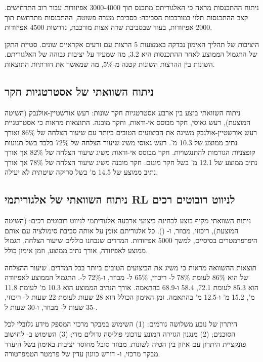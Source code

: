 ניתוח ההתכנסות מראה כי האלגוריתם מתכנס תוך 3000-4000 אפיזודות עבור רוב התרחישים. קצב ההתכנסות תלוי במורכבות הסביבה: בסביבת מערה פשוטה, ההתכנסות מתרחשת תוך 2000 אפיזודות, בעוד שבסביבת שדה אצות מורכבת, נדרשות 4500 אפיזודות.

היציבות של תהליך האימון נבדקה באמצעות 5 הרצות עם זרעים אקראיים שונים. סטיית התקן של התגמול הממוצע לאחר ההתכנסות היא 3.2, מה שמעיד על יציבות גבוהה של האלגוריתם. השונות בין ההרצות השונות קטנה מ-5\%, מה שמאשר את חזרתיות התוצאות.

\subsection{ניתוח השוואתי של אסטרטגיות חקר}
\label{sec:ch06_exploration_comparison}

ניתוח השוואתי בוצע בין ארבע אסטרטגיות חקר שונות: רעש אורשטיין-אולנבק (השיטה המוצעת), רעש גאוסי, חקר מבוסס אי-ודאות, וחקר מובנה. התוצאות מראות כי אסטרטגיית רעש אורשטיין-אולנבק משיגה את הביצועים הטובים ביותר עם שיעור הצלחה של 86\% ואורך נתיב ממוצע של 10.3 מ'. רעש גאוסי משיג שיעור הצלחה של 72\% בלבד בשל תנועות קופצניות הגורמות להתנגשויות. חקר מבוסס אי-ודאות משיג שיעור הצלחה של 82\% אך אורך נתיב ממוצע של 12.1 מ' בשל חקר מוגזם. חקר מובנה משיג שיעור הצלחה של 78\% אך אורך נתיב ממוצע של 14.5 מ' בשל סריקה שיטתית לא יעילה.

\subsection{ניתוח השוואתי של אלגוריתמי RL לניווט רובוטים רכים}
\label{sec:ch06_rl_comparison}

ניתוח השוואתי מקיף בוצע לבחינת ביצועי ארבעה אלגוריתמי  לניווט רובוטים רכים:  (השיטה המוצעת),  ריכוזי,  מבוזר, ו- (). כל אלגוריתם אומן על אותה סביבת סימולציה עם אותם היפרפרמטרים בסיסיים, למשך 5000 אפיזודות. המדדים שנבחנו כוללים שיעור הצלחה, תגמול ממוצע לאפיזודה, אורך נתיב ממוצע, וזמן אימון כולל.

תוצאות ההשוואה מראות כי  משיג את הביצועים הטובים ביותר בכל המדדים. שיעור ההצלחה של  הוא 86\% לעומת 78\% ל- ריכוזי, 65\% ל- מבוזר, ו-72\% ל-. התגמול הממוצע לאפיזודה הוא 85.3 לעומת 72.1, 58.4 ו-68.9 בהתאמה. אורך הנתיב הממוצע הוא 10.3 מ' לעומת 11.8 מ', 15.2 מ' ו-12.5 מ' בהתאמה. זמן האימון הכולל הוא 28 שעות לעומת 22 שעות ל- ריכוזי, 35 שעות ל- מבוזר, ו-30 שעות ל-.

היתרון של  נובע משלושה גורמים: (1) השימוש במבקר מרכזי המספק מידע גלובלי לכל הסוכנים; (2) מנגנון הגזירה המונע עדכוני פוליסה גדולים מדי; (3) השימוש ב- לחישוב פונקציית היתרון עם איזון בין הטיה לשונות.  מבוזר סובל מחוסר יציבות באימון בשל היעדר מבקר מרכזי, ו- דורש כוונון עדין של פרמטר הטמפרטורה.

